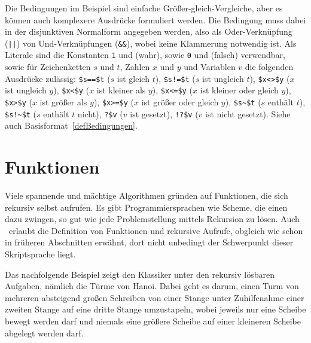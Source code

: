 Die Bedingungen im Beispiel sind einfache Größer-gleich-Vergleiche, aber es können auch komplexere Ausdrücke formuliert werden. Die Bedingung muss dabei in der disjunktiven Normalform angegeben werden, also als Oder-Verknüpfung (\verb=||=) von Und-Verknüpfungen (\verb|&&|), wobei keine Klammerung notwendig ist.
Als Literale sind die Konstanten \verb|1| und  (wahr), sowie \verb|0| und  (falsch) verwendbar, sowie für Zeichenketten $s$ und $t$, Zahlen $x$ und $y$ und Variablen $v$ die folgenden Ausdrücke zulässig: \verb|$s==$t| ($s$ ist gleich $t$), \verb|$s!=$t| ($s$ ist ungleich $t$), \verb|$x<>$y| ($x$ ist ungleich $y$), \verb|$x<$y| ($x$ ist kleiner als $y$), \verb|$x<=$y| ($x$ ist kleiner oder gleich $y$), \verb|$x>$y| ($x$ ist größer als $y$), \verb|$x>=$y| ($x$ ist größer oder gleich $y$), \verb|$s~$t| ($s$ enthält $t$), \verb|$s!~$t| ($s$ enthält $t$ nicht), \verb|?$v| ($v$ ist gesetzt), \verb|!?$v| ($v$ ist nicht gesetzt). Siehe auch Basisformat~\ref{defBedingungen}.

\section{Funktionen}\label{Funktionen}
Viele spannende und mächtige Algorithmen gründen auf Funktionen, die sich rekursiv selbst aufrufen. Es gibt Programmiersprachen wie Scheme, die einen dazu zwingen, so gut wie jede Problemstellung mittels Rekursion zu lösen. Auch \FPZ\ erlaubt die Definition von Funktionen und rekursive Aufrufe, obgleich wie schon in früheren Abschnitten erwähnt, dort nicht unbedingt der Schwerpunkt dieser Skriptsprache liegt.

Das nachfolgende Beispiel zeigt den Klassiker unter den rekursiv lösbaren Aufgaben, nämlich die Türme von Hanoi. Dabei geht es darum, einen Turm von mehreren absteigend großen Schreiben von einer Stange unter Zuhilfenahme einer zweiten Stange auf eine dritte Stange umzustapeln, wobei jeweils nur eine Scheibe bewegt werden darf und niemals eine größere Scheibe auf einer kleineren Scheibe abgelegt werden darf.

